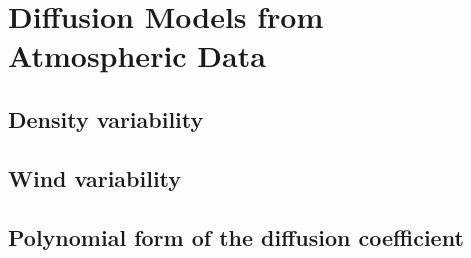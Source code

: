 
\section{Diffusion Models from Atmospheric Data}
\label{p3:apx:diffusion}

\subsection{Density variability}
\label{p3:sub:apx_density_variability}

\subsection{Wind variability}
\label{p3:sub:apx_wind_variability}

\subsection{Polynomial form of the diffusion coefficient}
\label{p3:sub:apx_polynomial_diffusion}
